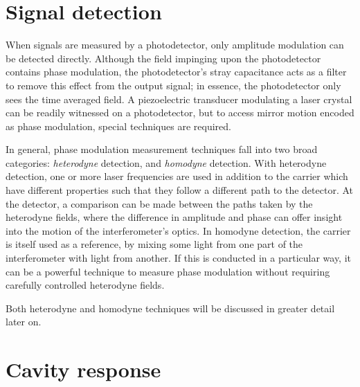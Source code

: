 \section{Signal detection}
When signals are measured by a photodetector, only amplitude modulation can be detected directly. Although the field impinging upon the photodetector contains phase modulation, the photodetector's stray capacitance acts as a filter to remove this effect from the output signal; in essence, the photodetector only sees the time averaged field. A piezoelectric transducer modulating a laser crystal can be readily witnessed on a photodetector, but to access mirror motion encoded as phase modulation, special techniques are required.

In general, phase modulation measurement techniques fall into two broad categories: \emph{heterodyne} detection, and \emph{homodyne} detection. With heterodyne detection, one or more laser frequencies are used in addition to the carrier which have different properties such that they follow a different path to the detector. At the detector, a comparison can be made between the paths taken by the heterodyne fields, where the difference in amplitude and phase can offer insight into the motion of the interferometer's optics. In homodyne detection, the carrier is itself used as a reference, by mixing some light from one part of the interferometer with light from another. If this is conducted in a particular way, it can be a powerful technique to measure phase modulation without requiring carefully controlled heterodyne fields.

Both heterodyne and homodyne techniques will be discussed in greater detail later on.



\section{Cavity response}
